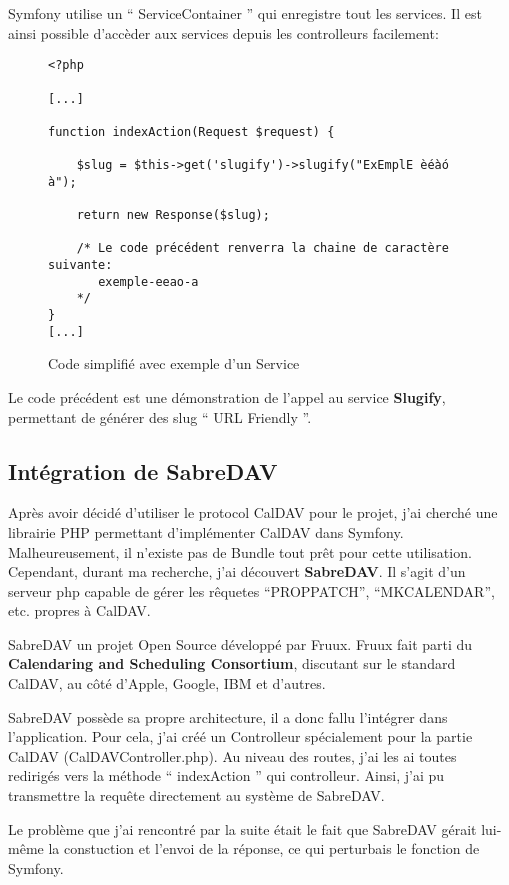 Symfony utilise un `` ServiceContainer '' qui enregistre tout les services. Il est ainsi possible d'accèder aux services depuis les controlleurs facilement:

\begin{figure}[h]
\begin{lstlisting}[frame=single]
<?php

[...]

function indexAction(Request $request) {

    $slug = $this->get('slugify')->slugify("ExEmplE èéàó à");

    return new Response($slug);

    /* Le code précédent renverra la chaine de caractère suivante:
       exemple-eeao-a
    */
}
[...]

\end{lstlisting}
\caption{Code simplifié avec exemple d'un Service}
\end{figure}

\newpage

Le code précédent est une démonstration de l'appel au service \textbf{Slugify}, permettant de générer des slug `` URL Friendly ''.

\subsection{Intégration de SabreDAV}

Après avoir décidé d'utiliser le protocol CalDAV pour le projet, j'ai cherché une librairie PHP permettant d'implémenter CalDAV dans Symfony. Malheureusement, il n'existe pas de Bundle tout prêt pour cette utilisation. Cependant, durant ma recherche, j'ai découvert \textbf{SabreDAV}. Il s'agit d'un serveur php capable de gérer les rêquetes ``PROPPATCH'', ``MKCALENDAR'', etc. propres à CalDAV.

SabreDAV un projet Open Source développé par Fruux. Fruux fait parti du \textbf{Calendaring and Scheduling Consortium}, discutant sur le standard CalDAV, au côté d'Apple, Google, IBM et d'autres.

SabreDAV possède sa propre architecture, il a donc fallu l'intégrer dans l'application. Pour cela, j'ai créé un Controlleur spécialement pour la partie CalDAV (CalDAVController.php). Au niveau des routes, j'ai les ai toutes redirigés vers la méthode `` indexAction '' qui controlleur. Ainsi, j'ai pu transmettre la requête directement au système de SabreDAV.

Le problème que j'ai rencontré par la suite était le fait que SabreDAV gérait lui-même la constuction et l'envoi de la réponse, ce qui perturbais le fonction de Symfony.

